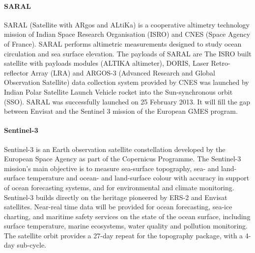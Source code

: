 \paragraph{SARAL}
SARAL (Satellite with ARgos and ALtiKa) is a cooperative altimetry technology mission of Indian Space Research Organisation (ISRO) and CNES (Space Agency of France). SARAL performs altimetric measurements designed to study ocean circulation and sea surface elevation. The payloads of SARAL are The ISRO built satellite with payloads modules (ALTIKA altimeter), DORIS, Laser Retro-reflector Array (LRA) and ARGOS-3 (Advanced Research and Global Observation Satellite) data collection system provided by CNES was launched by Indian Polar Satellite Launch Vehicle rocket into the Sun-synchronous orbit (SSO). SARAL was successfully launched on 25 February 2013. It will fill the gap between Envisat and the Sentinel 3 mission of the European GMES program.
\paragraph{Sentinel-3}
Sentinel-3 is an Earth observation satellite constellation developed by the European Space Agency as part of the Copernicus Programme. The Sentinel-3 mission's main objective is to measure sea-surface topography, sea- and land-surface temperature and ocean- and land-surface colour with accuracy in support of ocean forecasting systems, and for environmental and climate monitoring. Sentinel-3 builds directly on the heritage pioneered by ERS-2 and Envisat satellites. Near-real time data will be provided for ocean forecasting, sea-ice charting, and maritime safety services on the state of the ocean surface, including surface temperature, marine ecosystems, water quality and pollution monitoring. The satellite orbit provides a 27-day repeat for the topography package, with a 4-day sub-cycle.
\clearpage
